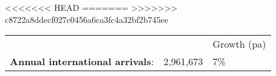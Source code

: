 <<<<<<< HEAD
=======
>>>>>>> c8722a8ddecf027c0456a6ca3fc4a32bf2b745ee
\begin{tabular}[t]{p{4.8cm}>{\hfill}p{1.3cm}>{\hfill}p{1.4cm}}
   &   & Growth (pa) \\ 
 \textbf{Annual international arrivals}: & 2,961,673 & 7\% \\ 
  \end{tabular}
